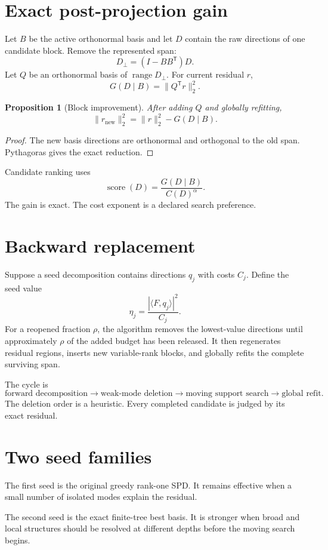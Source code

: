 \documentclass[11pt]{article}
\newtheorem{proposition}[theorem]{Proposition}
\theoremstyle{definition}
\theoremstyle{remark}
\begin{document}
\section{Exact post-projection gain}
Let $B$ be the active orthonormal basis and let $D$ contain the raw directions of one candidate block. Remove the represented span:
\[
D_\perp=(I-BB^{\mathsf T})D.
\]
Let $Q$ be an orthonormal basis of $\operatorname{range}D_\perp$. For current residual $r$,
\[
\boxed{G(D\mid B)=\|Q^{\mathsf T}r\|_2^2.}
\]

\begin{proposition}[Block improvement]
After adding $Q$ and globally refitting,
\[
\|r_{\mathrm{new}}\|_2^2=\|r\|_2^2-G(D\mid B).
\]
\end{proposition}

\begin{proof}
The new basis directions are orthonormal and orthogonal to the old span. Pythagoras gives the exact reduction.
\end{proof}

Candidate ranking uses
\[
\operatorname{score}(D)=\frac{G(D\mid B)}{C(D)^\alpha}.
\]
The gain is exact. The cost exponent is a declared search preference.

\section{Backward replacement}
Suppose a seed decomposition contains directions $q_j$ with costs $C_j$. Define the seed value
\[
\eta_j=\frac{|\langle F,q_j\rangle|^2}{C_j}.
\]
For a reopened fraction $\rho$, the algorithm removes the lowest-value directions until approximately $\rho$ of the added budget has been released. It then regenerates residual regions, inserts new variable-rank blocks, and globally refits the complete surviving span.

The cycle is
\[
\boxed{
\text{forward decomposition}
\longrightarrow
\text{weak-mode deletion}
\longrightarrow
\text{moving support search}
\longrightarrow
\text{global refit}.
}
\]
The deletion order is a heuristic. Every completed candidate is judged by its exact residual.

\section{Two seed families}
The first seed is the original greedy rank-one SPD. It remains effective when a small number of isolated modes explain the residual.

The second seed is the exact finite-tree best basis. It is stronger when broad and local structures should be resolved at different depths before the moving search begins.
\end{document}
